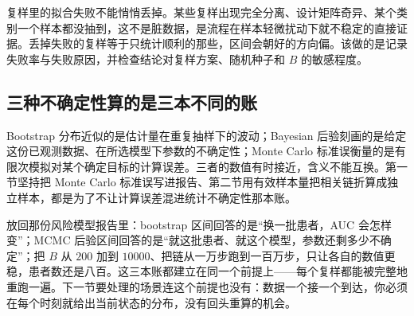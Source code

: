 复样里的拟合失败不能悄悄丢掉。某些复样出现完全分离、设计矩阵奇异、某个类别一个样本都没抽到，这不是脏数据，是流程在样本轻微扰动下就不稳定的直接证据。丢掉失败的复样等于只统计顺利的那些，区间会朝好的方向偏。该做的是记录失败率与失败原因，并检查结论对复样方案、随机种子和 \(B\) 的敏感程度。

\subsection{三种不确定性算的是三本不同的账}

Bootstrap 分布近似的是估计量在重复抽样下的波动；Bayesian 后验刻画的是给定这份已观测数据、在所选模型下参数的不确定性；Monte Carlo 标准误衡量的是有限次模拟对某个确定目标的计算误差。三者的数值有时接近，含义不能互换。第一节坚持把 Monte Carlo 标准误写进报告、第二节用有效样本量把相关链折算成独立样本，都是为了不让计算误差混进统计不确定性那本账。

放回那份风险模型报告里：bootstrap 区间回答的是``换一批患者，AUC 会怎样变''；MCMC 后验区间回答的是``就这批患者、就这个模型，参数还剩多少不确定''；把 \(B\) 从 \(200\) 加到 \(10000\)、把链从一万步跑到一百万步，只让各自的数值更稳，患者数还是八百。这三本账都建立在同一个前提上——每个复样都能被完整地重跑一遍。下一节要处理的场景连这个前提也没有：数据一个接一个到达，你必须在每个时刻就给出当前状态的分布，没有回头重算的机会。

